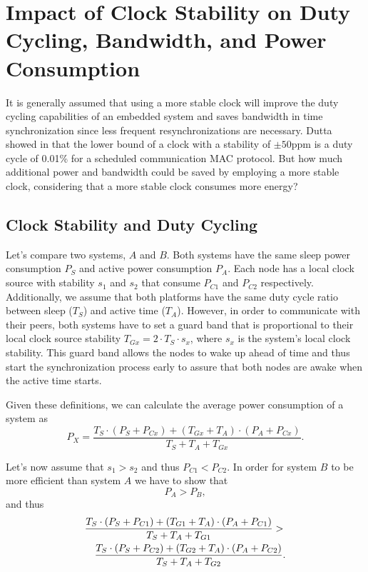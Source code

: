 \section{Impact of Clock Stability on Duty Cycling, Bandwidth, and Power Consumption}
\label{sec:power}

It is generally assumed that using a more stable clock will improve the duty
cycling capabilities of an embedded system and saves bandwidth in time
synchronization since less frequent resynchronizations are necessary. Dutta
showed in \cite{dutta2007procrastination} that the lower bound of a clock with
a stability of $\pm 50$ppm is a duty cycle of 0.01\% for a scheduled
communication MAC protocol. But how much additional power and bandwidth could be saved by
employing a more stable clock, considering that a more stable clock consumes
more energy? 

\subsection{Clock Stability and Duty Cycling}
Let's compare two systems, $A$ and $B$. Both systems have the same sleep power
consumption $P_S$ and active power consumption $P_A$.  Each node has a local
clock source with stability $s_1$ and $s_2$ that consume $P_{C1}$ and $P_{C2}$
respectively. Additionally, we assume that both platforms have the same duty
cycle ratio between sleep ($T_S$) and active time ($T_A$). However, in order
to communicate with their peers, both systems have to set a guard band that is
proportional to their local clock source stability $T_{Gx} = 2 \cdot T_S \cdot
s_x$, where $s_x$ is the system's local clock stability. This guard band
allows the nodes to wake up ahead of time and thus start the synchronization
process early to assure that both nodes are awake when the active time starts.

Given these definitions, we can calculate the average power consumption of a
system as
\begin{equation}
	P_X = \frac{T_S \cdot (P_S + P_{Cx}) + (T_{Gx} + T_A) \cdot (P_A + P_{Cx})}{T_S + T_A + T_{Gx}}.
\end{equation}

Let's now assume that $s_1 > s_2$ and thus $P_{C1} < P_{C2}$. In order for
system $B$ to be more efficient than system $A$ we have to show that
\begin{equation}
	P_A > P_B,
\end{equation}
and thus
\begin{eqnarray}
	\lefteqn{\frac{T_S \cdot (P_S + P_{C1}) + (T_{G1} + T_A) \cdot (P_A + P_{C1})}{T_S + T_A + T_{G1}}  > } \nonumber \\
	& & \frac{T_S \cdot (P_S + P_{C2}) + (T_{G2} + T_A) \cdot (P_A +
	P_{C2})}{T_S + T_A + T_{G2}}.\label{eq:1}
\end{eqnarray}


